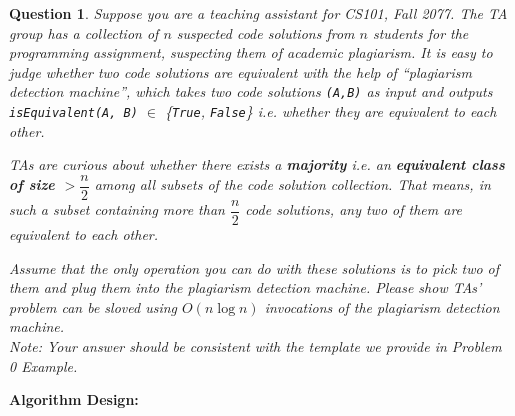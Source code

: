 \documentclass{article}
\newtheorem{Q}{Question}
\begin{document}
\newpage

\begin{Q}
	Suppose you are a teaching assistant for CS101, Fall 2077. The TA group has a collection of $n$ suspected code solutions from $n$ students for the programming assignment, suspecting them of academic plagiarism. It is easy to judge whether two code solutions are equivalent with the help of ``plagiarism detection machine'', which takes two code solutions \texttt{(A,B)} as input and outputs \texttt{isEquivalent(A, B)} $\in$ \{\texttt{True}, \texttt{False}\} i.e. whether they are equivalent to each other.

	TAs are curious about whether there exists a \textbf{majority} i.e. an \textbf{equivalent class of size $>\dfrac{n}{2}$} among all subsets of the code solution collection. That means, in such a subset containing more than $\dfrac{n}{2}$ code solutions, any two of them are equivalent to each other.

	Assume that the only operation you can do with these solutions is to pick two of them and plug them into the plagiarism detection machine. Please show TAs' problem can be sloved using $O(n\log n)$ invocations of the plagiarism detection machine.\\

	Note: Your answer should be consistent with the template we provide in Problem 0 Example.

	\noindent
\end{Q}

\textbf{Algorithm Design:}
\end{document}
